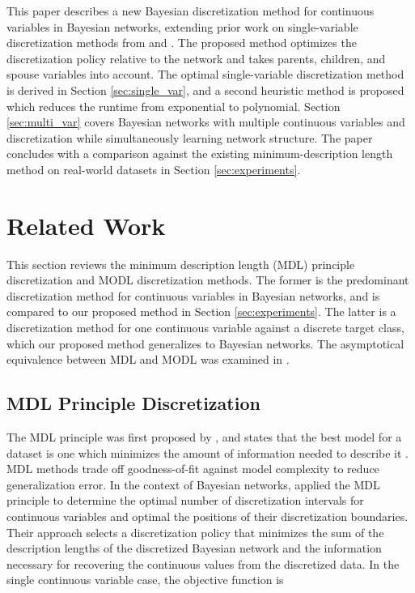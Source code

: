 This paper describes a new Bayesian discretization method for continuous variables in Bayesian networks, extending prior work on single-variable discretization methods from \citet{Boulle_2006} and \citet{Lustgarten_2011}.
The proposed method optimizes the discretization policy relative to the network and takes parents, children, and spouse variables into account.
The optimal single-variable discretization method is derived in Section \ref{sec:single_var}, and a second heuristic method is proposed which reduces the runtime from exponential to polynomial.
Section \ref{sec:multi_var} covers Bayesian networks with multiple continuous variables and discretization while simultaneously learning network structure.
The paper concludes with a comparison against the existing minimum-description length \citep{Friedman_1996} method on real-world datasets in Section \ref{sec:experiments}.


\section{Related Work}
\label{sec:related_work}
This section reviews the minimum description length (MDL) principle discretization \citep{Friedman_1996} and MODL discretization \citep{Boulle_2006} methods.
The former is the predominant discretization method for continuous variables in Bayesian networks, and is compared to our proposed method in Section \ref{sec:experiments}.
The latter is a discretization method for one continuous variable against a discrete target class, which our proposed method generalizes to Bayesian networks.
The asymptotical equivalence between MDL and MODL was examined in \citep{VL_2000}.

\subsection{MDL Principle Discretization}
The MDL principle was first proposed by \cite{MDL_1978}, and states that the best model for a dataset is one which minimizes the amount of information needed to describe it \citep{Grunwald_2009}.
MDL methods trade off goodness-of-fit against model complexity to reduce generalization error.
In the context of Bayesian networks, \cite{Friedman_1996} applied the MDL principle to determine the optimal number of discretization intervals for continuous variables and optimal the positions of their discretization boundaries.
Their approach selects a discretization policy that minimizes the sum of the description lengths of the discretized Bayesian network and the information necessary for recovering the continuous values from the discretized data.
In the single continuous variable case, the objective function is

